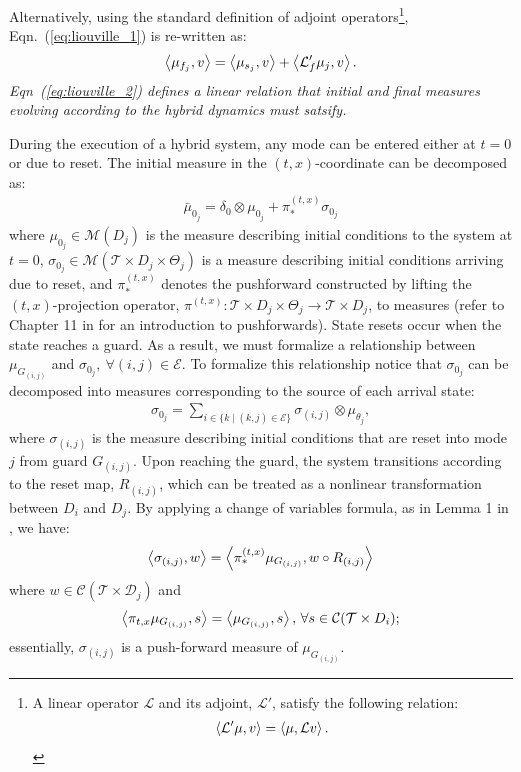 Alternatively, using the standard definition of adjoint operators\footnote{A linear operator $\mathcal L$ and its adjoint, $\mathcal L'$, satisfy the following relation:
\begin{align*}
    \left\langle \mathcal L'\mu,v\right\rangle=\left\langle \mu,\mathcal Lv\right\rangle.
\end{align*}
}, Eqn.~(\ref{eq:liouville_1}) is re-written as:
\begin{align}
\left\langle \mu_{f_j},v\right\rangle=\left\langle \mu_{s_j},v\right\rangle+\left\langle \mathcal L'_{f}\mu_{j},v\right\rangle.
  \label{eq:liouville_2}
\end{align}
\emph{Eqn~(\ref{eq:liouville_2}) defines a linear relation that initial and final measures evolving according to the hybrid dynamics must satsify.}


During the execution of a hybrid system, any mode can be entered either at $t=0$ or due to reset.
The initial measure in the $(t,x)$-coordinate can be decomposed as:
\begin{align}
  \bar\mu_{0_j}=\delta_0\otimes\mu_{0_j}+\pi^{(t,x)}_*\sigma_{0_j}
\end{align}
where $\mu_{0_j}\in \mathcal M(D_j)$ is the measure describing initial conditions to the system at $t=0$, $\sigma_{0_j}\in \mathcal M(\mathcal T\times D_j\times \Theta_j)$ is a measure describing initial conditions arriving due to reset, and $\pi^{(t,x)}_*$ denotes the pushforward constructed by lifting the $(t,x)$-projection operator, $\pi^{(t,x)}: \mathcal T\times D_j\times \Theta_j \to \mathcal T\times D_j$, to measures (refer to Chapter 11 in \cite{lee2003smooth} for an introduction to pushforwards).
State resets occur when the state reaches a guard.
As a result, we must formalize a relationship between $\mu_{ G_{(i,j)}}$ and $\sigma_{0_j},~\forall (i,j)\in \mathcal E$.
To formalize this relationship notice that $\sigma_{0_j}$ can be decomposed into measures corresponding to the source of each arrival state:
\begin{align}
  \sigma_{0_j}=\sum_{i\in \{k\mid (k,j)\in \mathcal E\}} \sigma_{(i,j)}\otimes \mu_{\theta_j},
\end{align}
where $\sigma_{(i,j)}$ is the measure describing initial conditions that are reset into mode $j$ from guard $G_{(i,j)}$.
Upon reaching the guard, the system transitions according to the reset map, $R_{(i,j)}$, which can be treated as a nonlinear transformation between $D_i$ and $D_j$.
By applying a change of variables formula, as in Lemma 1 in \cite{shia2014convex}, we have:
\begin{align}
    \left\langle \sigma_{(i,j)},w\right\rangle=\left\langle \pi^{(t,x)}_*\mu_{ G_{(i,j)}},w\circ R_{(i,j)}\right\rangle
    \label{eq:reset_measure}
\end{align}
where $w\in \mathcal C(\mathcal T\times \mathcal D_j)$ and
$$
  \left\langle \pi_{t,x}\mu_{ G_{(i,j)}},s\right\rangle=\left\langle \mu_{ G_{(i,j)}},s\right\rangle,\,\forall s\in \mathcal C(\mathcal T\times D_i);
$$
essentially, $\sigma_{(i,j)}$ is a push-forward measure of $\mu_{ G_{(i,j)}}$.
